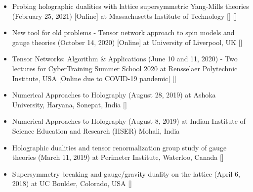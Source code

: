 \begin{itemize}
 \item Probing holographic dualities with lattice supersymmetric Yang-Mills theories 
 (February 25, 2021) [Online] at Massachusetts Institute of Technology 
   [\texttt{\textbf{}}]  [\texttt{\textbf{}}] 
 \vspace{1mm} 
 
 \item New tool for old problems - Tensor network approach to spin models and gauge theories 
 (October 14, 2020) [Online] at University of Liverpool, UK
  [\texttt{\textbf{}}] 
 \vspace{1mm} 
  
 \item Tensor Networks: Algorithm \& Applications (June 10 and 11, 2020) - Two lectures for 
 CyberTraining Summer School 2020 at Rensselaer Polytechnic Institute, USA [Online due to COVID-19 pandemic]  
   [\texttt{\textbf{}}]  
\vspace{1mm} 


 \item Numerical Approaches to Holography (August 28, 2019) at Ashoka University, Haryana, Sonepat, India
   [\texttt{\textbf{}}] 
  \vspace{1mm} 
 
 \item Numerical Approaches to Holography (August 8, 2019) at Indian Institute of Science Education and Research (IISER) Mohali, India \vspace{1mm} 
 
  \item Holographic dualities and tensor renormalization group study of gauge theories (March 11, 2019) at Perimeter Institute, Waterloo, Canada 
 [\texttt{\textbf{}}] 
\vspace{1mm} 


  \item Supersymmetry breaking and gauge/gravity duality on the lattice (April 6, 2018) at UC Boulder, Colorado, USA 
    [\texttt{\textbf{}}] 
  \vspace{1mm} 
  

\end{itemize}
